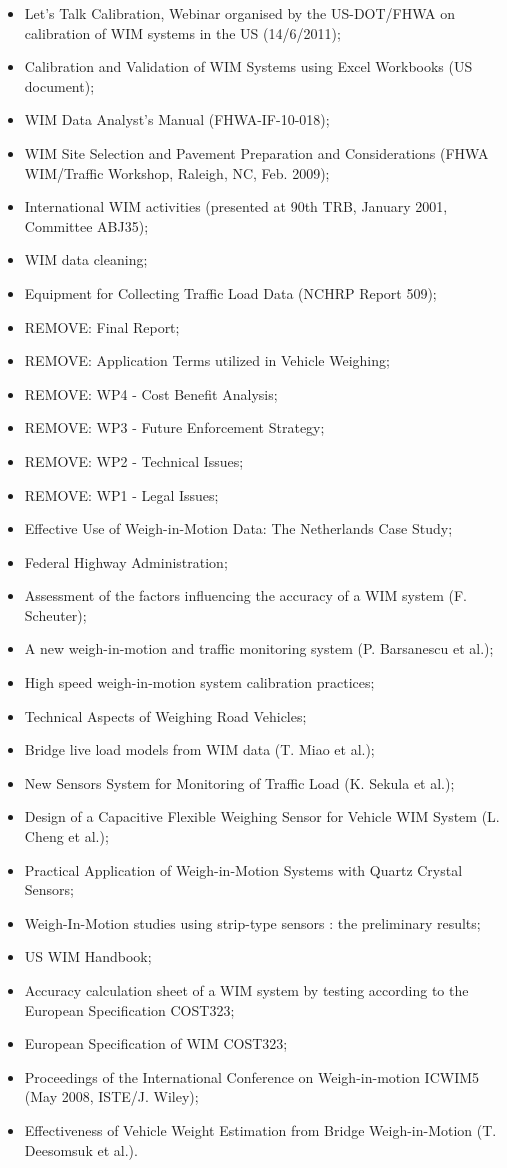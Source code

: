 \documentclass{ufscThesis}
\begin{document}
\begin{itemize}
\item Let's Talk Calibration, Webinar organised by the US-DOT/FHWA on calibration of WIM systems in the US (14/6/2011);
\item Calibration and Validation of WIM Systems using Excel Workbooks (US document);
\item WIM Data Analyst's Manual (FHWA-IF-10-018);
\item WIM Site Selection and Pavement Preparation and Considerations (FHWA WIM/Traffic Workshop, Raleigh, NC, Feb. 2009);
\item International WIM activities (presented at 90th TRB, January 2001, Committee ABJ35);
\item WIM data cleaning;
\item Equipment for Collecting Traffic Load Data (NCHRP Report 509);
\item REMOVE: Final Report;
\item REMOVE: Application Terms utilized in Vehicle Weighing;
\item REMOVE: WP4 - Cost Benefit Analysis;
\item REMOVE: WP3 - Future Enforcement Strategy;
\item REMOVE: WP2 - Technical Issues;
\item REMOVE: WP1 - Legal Issues;
\item Effective Use of Weigh-in-Motion Data: The Netherlands Case Study;
\item Federal Highway Administration;
\item Assessment of the factors influencing the accuracy of a WIM system (F. Scheuter);
\item A new weigh-in-motion and traffic monitoring system (P. Barsanescu et al.);
\item High speed weigh-in-motion system calibration practices;
\item Technical Aspects of Weighing Road Vehicles;
\item Bridge live load models from WIM data (T. Miao et al.);
\item New Sensors System for Monitoring of Traffic Load (K. Sekula et al.);
\item Design of a Capacitive Flexible Weighing Sensor for Vehicle WIM System (L. Cheng et al.);
\item Practical Application of Weigh-in-Motion Systems with Quartz Crystal Sensors;
\item Weigh-In-Motion studies using strip-type sensors : the preliminary results;
\item US WIM Handbook;
\item Accuracy calculation sheet of a WIM system by testing according to the European Specification COST323;
\item European Specification of WIM COST323;
\item Proceedings of the International Conference on Weigh-in-motion ICWIM5 (May 2008, ISTE/J. Wiley);
\item Effectiveness of Vehicle Weight Estimation from Bridge Weigh-in-Motion (T. Deesomsuk et al.).
\end{itemize}
\end{document}
